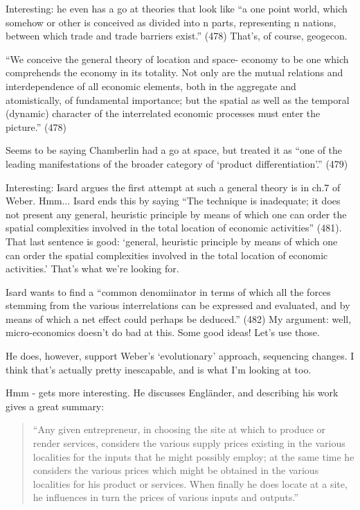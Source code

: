 Interesting: he even has a go at theories that look like ``a one point world, which somehow or other is conceived as divided into n parts, representing n nations, between which trade and trade barriers exist.'' (478) That's, of course, geogecon.

``We conceive the general theory of location and space- economy to be one which comprehends the economy in its totality. Not only are the mutual relations and interdependence of all economic elements, both in the aggregate and atomistically, of fundamental importance; but the spatial as well as the temporal (dynamic) character of the interrelated economic processes must enter the picture.'' (478)

Seems to be saying Chamberlin had a go at space, but treated it as ``one of the leading manifestations of the broader category of `product differentiation'.'' (479)

Interesting: Isard argues the first attempt at such a general theory is in ch.7 of Weber. Hmm... Isard ends this by saying ``The technique is inadequate; it does not present any general, heuristic principle by means of which one can order the spatial complexities involved in the total location of economic activities'' (481). That last sentence is good: `general, heuristic principle by means of which one can order the spatial complexities involved in the total location of economic activities.' That's what we're looking for.

Isard wants to find a ``common denomiinator in terms of which all the forces stemming from the various interrelations can be expressed and evaluated, and by means of which a net effect could perhaps be deduced.'' (482) My argument: well, micro-economics doesn't do bad at this. Some good ideas! Let's use those.

He does, however, support Weber's `evolutionary' approach, sequencing changes. I think that's actually pretty inescapable, and is what I'm looking at too. 

Hmm - gets more interesting. He discusses Engl\"{a}nder, and describing his work gives a great summary:

\begin{quote}
``Any given entrepreneur, in choosing the site at which to produce or render services, considers the various supply prices existing in the various localities for the inputs that he might possibly employ; at the same time he considers the various prices which might be obtained in the various localities for his product or services. When finally he does locate at a site, he influences in turn the prices of various inputs and outputs.''
\end{quote}

